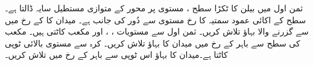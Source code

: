 ثمن اول میں بیلن  کا ٹکڑا سطح  ، مستوی  پر محور  کے متوازی  مستطیل سایہ
   ڈالتا ہے۔ سطح  کے اکائی عمود سمتیہ  کا رخ  مستوی   سے دُور  کی جانب  ہے۔ میدان  کا  کے رخ میں    سے گزرنے والا بہاؤ تلاش کریں۔
ثمن اول سے مستویات ، ، اور    مکعب کاٹتی ہیں۔ مکعب کی سطح سے باہر  کے رخ  میں میدان
  کا بہاؤ تلاش کریں۔
کرہ   سے مستوی      بالائی ٹوپی کاٹتا ہے۔میدان   کا بہاؤ   اس ٹوپی سے باہر  کے رخ   میں تلاش کریں۔

